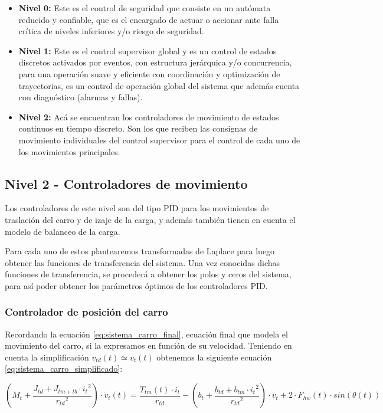 \documentclass[11pt]{article}
\begin{document}
\begin{itemize}
	\item \textbf{Nivel 0:} Este es el control de seguridad que consiste en un autómata reducido y confiable, que es el encargado de actuar o accionar ante falla crítica de niveles inferiores y/o riesgo de seguridad.
	\item \textbf{Nivel 1:} Este es el control supervisor global y es un control de estados discretos activados por eventos, con estructura jerárquica y/o concurrencia, para una operación suave y eficiente con coordinación y optimización de trayectorias, es un control de operación global del sistema que además cuenta con diagnóstico (alarmas y fallas).
	\item \textbf{Nivel 2:} Acá se encuentran los controladores de movimiento de estados continuos en tiempo discreto. Son los que reciben las consignas de movimiento individuales del control supervisor para el control de cada uno de los movimientos principales.
\end{itemize}

\subsection{Nivel 2 - Controladores de movimiento}
Los controladores de este nivel son del tipo PID para los movimientos de traslación del carro y de izaje de la carga, y además también tienen en cuenta el modelo de balanceo de la carga.

Para cada uno de estos plantearemos transformadas de Laplace para luego obtener las funciones de transferencia del sistema. Una vez conocidas dichas funciones de transferencia, se procederá a obtener los polos y ceros del sistema, para así poder obtener los parámetros óptimos de los controladores PID.

\newpage

\subsubsection{Controlador de posición del carro}
Recordando la ecuación \ref{eq:sistema_carro_final}, ecuación final que modela el movimiento del carro, si la expresamos en función de su velocidad. Teniendo en cuenta la simplificación $v_{td}(t)\simeq v_{t}(t)$ obtenemos la siguiente ecuación \ref{eq:sistema_carro_simplificado}:

\begin{equation}
	\label{eq:sistema_carro_simplificado}
	\left ( M_{t}+ \frac{J_{td}+J_{tm+tb}\cdot{i_{t}}^{2}}{{r_{td}}^{2}} \right )\cdot\dot{v}_{t}(t)=\frac{T_{tm}(t)\cdot i_{t}}{r_{td}}-\left (b_{t} +\frac{b_{td}+b_{tm}\cdot{i_{t}}^{2}}{{r_{td}}^{2}} \right )\cdot v_{t} + 2\cdot F_{hw}(t) \cdot sin \left ( \theta(t) \right )
\end{equation}
\end{document}
